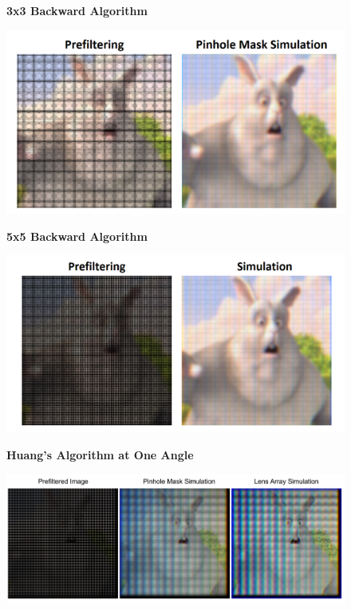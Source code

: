 \begin{figure}
    \centering
    \textbf{3x3 Backward Algorithm}\par\medskip
    \includegraphics[width=\columnwidth]{chapters/chapter9/images/3x3_backward.png}
\end{figure}

\begin{figure}
    \centering
    \textbf{5x5 Backward Algorithm}\par\medskip
    \includegraphics[width=\columnwidth]{chapters/chapter9/images/5x5_backward.png}
\end{figure}

\begin{figure}
    \centering
    \textbf{Huang's Algorithm at One Angle}\par\medskip
    \includegraphics[width=\columnwidth]{chapters/chapter9/images/Huang_1_angle.png}
\end{figure}

